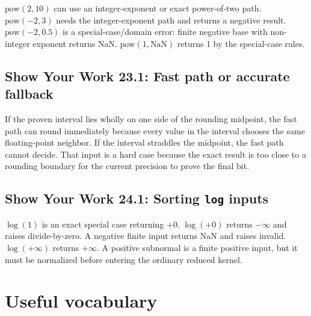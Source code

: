 \documentclass[manuscript, nonacm]{acmart}
\begin{document}
    $\mathrm{pow}(2,10)$ can use an integer-exponent or exact power-of-two path.
    $\mathrm{pow}(-2,3)$ needs the integer-exponent path and returns a negative
    result. $\mathrm{pow}(-2,0.5)$ is a special-case/domain error: finite negative
    base with non-integer exponent returns NaN. $\mathrm{pow}(1,\mathrm{NaN})$
    returns 1 by the special-case rules.

    \subsection*{Show Your Work 23.1: Fast path or accurate fallback}

    If the proven interval lies wholly on one side of the rounding midpoint, the
    fast path can round immediately because every value in the interval chooses
    the same floating-point neighbor. If the interval straddles the midpoint, the
    fast path cannot decide. That input is a hard case because the exact result is
    too close to a rounding boundary for the current precision to prove the final
    bit.

    \subsection*{Show Your Work 24.1: Sorting \texttt{log} inputs}

    $\log(1)$ is an exact special case returning $+0$. $\log(+0)$ returns
    $-\infty$ and raises divide-by-zero. A negative finite input returns NaN and
    raises invalid. $\log(+\infty)$ returns $+\infty$. A positive subnormal is a
    finite positive input, but it must be normalized before entering the ordinary
    reduced kernel.


    \section{Useful vocabulary}
\end{document}
